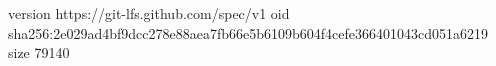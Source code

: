 version https://git-lfs.github.com/spec/v1
oid sha256:2e029ad4bf9dcc278e88aea7fb66e5b6109b604f4cefe366401043cd051a6219
size 79140
